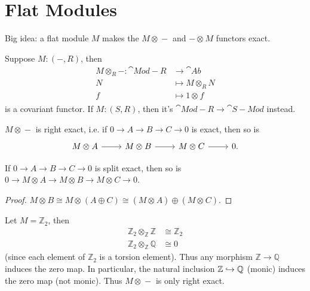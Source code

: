 \documentclass[twoside,10pt]{report}
\begin{document}
\section{Flat Modules}

\begin{note}[]
Big idea: a flat module $M$ makes the $M \otimes_{}-$ and $-\otimes_{}M$ functors exact.
\end{note}

Suppose $M:(-,R)$, then
\begin{align*}
	M \otimes_{R} - : \cat{Mod-R} &\to \cat{Ab} \\
			N &\mapsto M \otimes_{R} N \\
			f &\mapsto 1 \otimes_{}f
		\end{align*} is a covariant functor. If $M:(S,R)$, then it's $\cat{Mod-R}\to \cat{S-Mod}$ instead.

\begin{thrm}
$M \otimes_{}-$ is right exact, i.e. if $0\to A\to B\to C\to 0$ is exact, then so is
\[
\begin{tikzcd}
	M\otimes_{}A \rar & M\otimes_{}B \rar & M\otimes_{}C \rar & 0.
\end{tikzcd}
\] 
\end{thrm}

\begin{prop}
If $0\to A\to B\to C\to 0$ is split exact, then so is $0\to M\otimes_{}A\to M\otimes_{}B\to M\otimes_{}C\to 0$.
\end{prop}
\begin{proof}
	$M\otimes_{}B \cong M\otimes_{}(A \oplus C) \cong (M\otimes_{}A) \oplus (M\otimes_{}C)$.
\end{proof}

\begin{ex}[]
Let $M=\mathbb{Z}_2$, then
\begin{align*}
	\mathbb{Z}_2 \otimes_{\mathbb{Z}} \mathbb{Z} &\cong \mathbb{Z}_2 \\
	\mathbb{Z}_2 \otimes_{\mathbb{Z}} \mathbb{Q} &\cong 0
\end{align*}
(since each element of $\mathbb{Z}_2$ is a torsion element). Thus any morphism $\mathbb{Z}\to \mathbb{Q}$ induces the zero map. In particular, the natural inclusion $\mathbb{Z}\hookrightarrow \mathbb{Q}$ (monic) induces the zero map (not monic). Thus $M \otimes_{}-$ is only right exact.
\end{ex}
\end{document}
